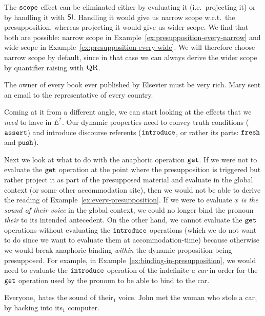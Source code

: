 The $\mathtt{scope}$ effect can be eliminated either by evaluating it (i.e.\
projecting it) or by handling it with $\mathsf{SI}$. Handling it would give us
narrow scope w.r.t.\ the presupposition, whereas projecting it would give
us wider scope. We find that both are possible: narrow scope in
Example~\ref{ex:presupposition-every-narrow} and wide scope in
Example~\ref{ex:presupposition-every-wide}. We will therefore choose
narrow scope by default, since in that case we can always derive the wider
scope by quantifier raising with $\textsc{QR}$.

\begin{exe}
  \ex The owner of every book ever published by Elsevier must be very
  rich. \label{ex:presupposition-every-narrow}
  \ex Mary sent an email to the representative of every
  country. \label{ex:presupposition-every-wide}
\end{exe}

Coming at it from a different angle, we can start looking at the effects
that we \emph{need} to have in $E^*$. Our dynamic properties need to convey
truth conditions ($\mathtt{assert}$) and introduce discourse referents
($\mathtt{introduce}$, or rather its parts: $\mathtt{fresh}$ and $\mathtt{push}$).

Next we look at what to do with the anaphoric operation $\mathtt{get}$. If we
were not to evaluate the $\mathtt{get}$ operation at the point where the
presupposition is triggered but rather project it as part of the
presupposed material and evaluate in the global context (or some other
accommodation site), then we would not be able to derive the reading of
Example~\ref{ex:every-presupposition}. If we were to evaluate \emph{$x$ is
  the sound of their voice} in the global context, we could no longer bind
the pronoun \emph{their} to its intended antecedent. On the other hand, we
cannot evaluate the $\mathtt{get}$ operations without evaluating the
$\mathtt{introduce}$ operations (which we do not want to do since we want to
evaluate them at accommodation-time) because otherwise we would break
anaphoric binding \emph{within} the dynamic proposition being
presupposed. For example, in Example~\ref{ex:binding-in-presupposition}, we
would need to evaluate the $\mathtt{introduce}$ operation of the indefinite
\emph{a car} in order for the $\mathtt{get}$ operation used by the pronoun to
be able to bind to the car.

\begin{exe}
  \ex Everyone$_1$ hates the sound of their$_1$
  voice. \label{ex:every-presupposition}
  \ex John met the woman who stole a car$_1$ by hacking into its$_1$
  computer. \label{ex:binding-in-presupposition}
\end{exe}

